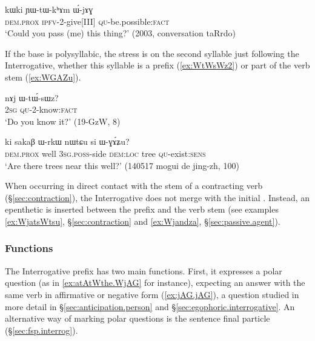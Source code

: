 \begin{exe}
\ex \label{ex:YWtWkhAm.WjAG}
 \gll kɯki ɲɯ-tɯ-kʰɤm ɯ́-jɤɣ \\
 \textsc{dem}.\textsc{prox} \textsc{ipfv}-2-give[III] \textsc{qu}-be.possible:\textsc{fact} \\
\glt `Could you pass (me) this thing?' (2003, conversation taRrdo)
\end{exe}

If the base is polysyllabic, the stress is on the second syllable just following the Interrogative, whether this syllable is a prefix (\ref{ex:WtWsWz2}) or part of the verb stem (\ref{ex:WGAZu}).

\begin{exe}
\ex \label{ex:WtWsWz2}
 \gll nɤj ɯ-tɯ́-sɯz? \\
\textsc{2sg} \textsc{qu}-2-know:\textsc{fact} \\
\glt `Do you know it?' (19-GzW, 8)
\end{exe}

\begin{exe}
\ex \label{ex:WGAZu}
 \gll ki sakaβ ɯ-rkɯ nɯtɕu si ɯ-ɣɤ́ʑu? \\
 \textsc{dem}.\textsc{prox} well \textsc{3sg}.\textsc{poss}-side \textsc{dem}:\textsc{loc} tree \textsc{qu}-exist:\textsc{sens} \\
 \glt `Are there trees near this well?' (140517 mogui de jing-zh, 100)
\end{exe}

When occurring in direct contact with the stem of a contracting verb (§\ref{sec:contraction}), the Interrogative  does not merge with the initial . Instead, an epenthetic  is inserted between the prefix and the verb stem (see examples \ref{ex:WjatsWtsu},  §\ref{sec:contraction} and \ref{ex:Wjandza}, §\ref{sec:passive.agent}).



 \subsubsection{Functions} \label{sec:interrogative.W.function}
The Interrogative prefix  has two main functions.  First, it expresses a polar question (as in \ref{ex:atAtWthe.WjAG} for instance), expecting an answer with the same verb in affirmative or negative form (\ref{ex:jAG.jAG}), a question studied in more detail in §\ref{sec:anticipation.person} and §\ref{sec:egophoric.interrogative}. An alternative way of marking polar questions is the sentence final particle  (§\ref{sec:fsp.interrog}).


